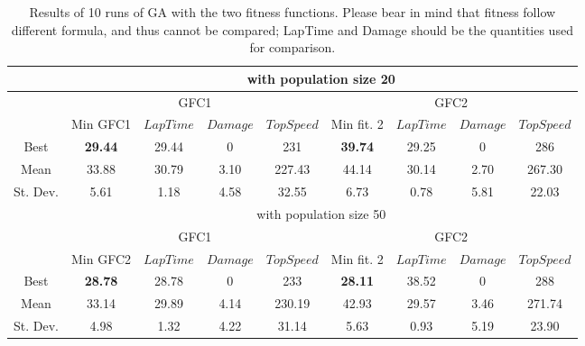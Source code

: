 \documentclass[sigconf]{acmart}
\begin{document}
\begin{table}[ht]
	\centering
	{\scriptsize
		\caption{ Results of 10 runs of GA with the two fitness
			functions. Please bear in mind that fitness follow different
			formula, and thus cannot be compared; LapTime and Damage
			should be the quantities used for comparison. }
		{
			\begin{tabular}{|c||c|c|c|c||c|c|c|c|}
				\hline
				&\multicolumn{8}{c||}{ with population size 20}\\ %
				
				\hline
				&\multicolumn{4}{c||}{GFC1}&\multicolumn{4}{c|}{GFC2}\\
				\cline{2-9}
				& Min GFC1 & $LapTime$ & $Damage$ & $TopSpeed$& Min fit. 2& $LapTime$ & $Damage$ & $TopSpeed$\\
				\hline
				
				
				Best &\textbf{29.44}& 29.44& 0&231&\textbf{39.74} & 29.25& 0& 286\\
				
				
				
				
				
				
				
				\hline
				Mean &33.88 &30.79 &3.10&227.43&   44.14&  30.14 &   2.70&267.30\\ 
				St. Dev.&5.61&1.18&4.58&32.55&6.73&0.78 &5.81  & 22.03\\
				\hline
				\hline
				&\multicolumn{8}{c||}{ with population size 50}\\
				\hline
				&\multicolumn{4}{c||}{GFC1}&\multicolumn{4}{c|}{GFC2}\\
				\cline{2-9}
				& Min GFC2 & $LapTime$ & $Damage$ & $TopSpeed$& Min fit. 2& $LapTime$ & $Damage$ & $TopSpeed$\\
				\hline
				Best &\textbf{28.78}& 28.78& 0&233&\textbf{28.11} & 38.52& 0& 288\\
				\hline
				Mean &33.14 &29.89 &4.14&230.19&   42.93&  29.57 &   3.46&271.74\\ 
				St. Dev.&4.98&1.32&4.22&31.14&5.63&0.93 &5.19  & 23.90\\
				\hline
				

\end{tabular}}}
\end{table}
\end{document}
